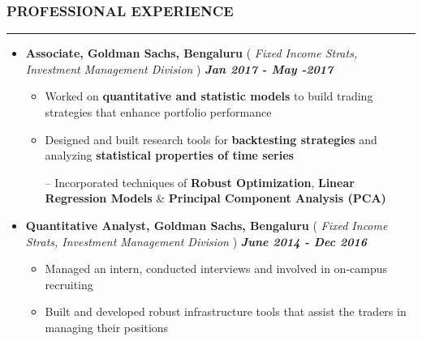 \documentclass[10pt,a4paper,English]{article}
\newcommand\roottitle[1]{\vspace{-4mm}\subsubsection*{\uppercase{#1}}\vspace{-0.3em}\nopagebreak[4]\hrule\vspace{4mm}}
\newcommand\itemyear[1]{\hfill \textbf{\emph{\color{itemyear} #1}}}
\newcommand\itemenv{\setlength\itemsep{0.5pt} \addtolength{\itemindent}{-5mm}\vspace{-1.5mm}}
\begin{document}
\vspace{1.5mm}

\roottitle{Professional Experience}
\begin{itemize} \itemenv
    \item \textbf{Associate, Goldman Sachs, Bengaluru} \hfill (\emph{ Fixed Income Strats, Investment Management Division }) \itemyear{Jan 2017 - May -2017}
        \begin{itemize} \itemenv
            \item Worked on \textbf{quantitative and statistic models} to build trading strategies that enhance portfolio performance
            \item Designed and built research tools for \textbf{backtesting strategies} and analyzing \textbf{statistical properties of time series}
            \item[--] Incorporated techniques of \textbf{Robust Optimization}, \textbf{Linear Regression Models} \& \textbf{Principal Component Analysis (PCA)} 
        \end{itemize}
    \item \textbf{Quantitative Analyst, Goldman Sachs, Bengaluru} \hfill (\emph{ Fixed Income Strats, Investment Management Division }) \itemyear{June 2014 - Dec 2016}
        \begin{itemize} \itemenv 
            \item Managed an intern, conducted interviews and involved in on-campus recruiting
            \item Built and developed robust infrastructure tools that assist the traders in managing their positions
        \end{itemize}
\end{itemize}
\end{document}
